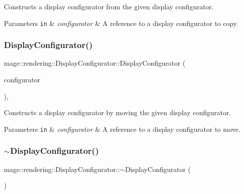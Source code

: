 Constructs a display configurator from the given display configurator.


\begin{DoxyParams}[1]{Parameters}
\mbox{\tt in}  & {\em configurator} & A reference to a display configurator to copy. \\
\hline
\end{DoxyParams}
\hypertarget{classmage_1_1rendering_1_1_display_configurator_ac75dae1c4df34dda067f1a5d99fdfefa}{}\label{classmage_1_1rendering_1_1_display_configurator_ac75dae1c4df34dda067f1a5d99fdfefa} 
\subsubsection{\texorpdfstring{Display\+Configurator()}{DisplayConfigurator()}\hspace{0.1cm}{\footnotesize\ttfamily [4/4]}}
{\footnotesize\ttfamily mage\+::rendering\+::\+Display\+Configurator\+::\+Display\+Configurator (\begin{DoxyParamCaption}\item[{\hyperlink{classmage_1_1rendering_1_1_display_configurator}{Display\+Configurator} \&\&}]{configurator }\end{DoxyParamCaption})\hspace{0.3cm}{\ttfamily [default]}, {\ttfamily [noexcept]}}

Constructs a display configurator by moving the given display configurator.


\begin{DoxyParams}[1]{Parameters}
\mbox{\tt in}  & {\em configurator} & A reference to a display configurator to move. \\
\hline
\end{DoxyParams}
\hypertarget{classmage_1_1rendering_1_1_display_configurator_a5ccba8cd97da75a7d1c425731fb848d4}{}\label{classmage_1_1rendering_1_1_display_configurator_a5ccba8cd97da75a7d1c425731fb848d4} 
\subsubsection{\texorpdfstring{$\sim$\+Display\+Configurator()}{~DisplayConfigurator()}}
{\footnotesize\ttfamily mage\+::rendering\+::\+Display\+Configurator\+::$\sim$\+Display\+Configurator (\begin{DoxyParamCaption}{ }\end{DoxyParamCaption})\hspace{0.3cm}{\ttfamily [default]}}

